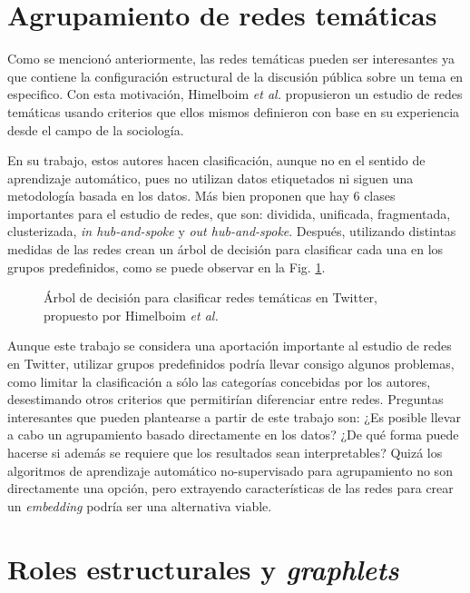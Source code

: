 \section{Agrupamiento de redes temáticas}

Como se mencionó anteriormente, las redes temáticas pueden ser interesantes ya que contiene la configuración estructural de la discusión pública sobre un tema en especifico. Con esta motivación, Himelboim \textit{ et al.} propusieron un estudio de redes temáticas usando criterios que ellos mismos definieron con base en su experiencia desde el campo de la sociología. 

En su trabajo, estos autores hacen clasificación, aunque no en el sentido de aprendizaje automático, pues no utilizan datos etiquetados ni siguen una metodología basada en los datos. Más bien proponen que hay 6 clases importantes para el estudio de redes, que son: dividida, unificada, fragmentada, clusterizada, \textit{in hub-and-spoke} y \textit{out hub-and-spoke}. Después, utilizando distintas medidas de las redes crean un árbol de decisión para clasificar cada una en los grupos predefinidos, como se puede observar en la Fig. \ref{fig:himelboim}.

 \begin{figure}[htbp]
   \centering
   
    \caption{Árbol de decisión para clasificar redes temáticas en Twitter, propuesto por Himelboim \textit{ et al.} \cite{himelboim_classifying_2017}} %
    \label{fig:himelboim}
\end{figure}

Aunque este trabajo se considera una aportación importante al estudio de redes en Twitter, utilizar grupos predefinidos podría llevar consigo algunos problemas, como limitar la clasificación a sólo las categorías concebidas por los autores, desestimando otros criterios que permitirían diferenciar entre redes. Preguntas interesantes que pueden plantearse a partir de este trabajo son: ¿Es posible llevar a cabo un agrupamiento basado directamente en los datos? ¿De qué forma puede hacerse si además se requiere que los resultados sean interpretables? Quizá los algoritmos de aprendizaje automático no-supervisado para agrupamiento no son directamente una opción, pero extrayendo características de las redes para crear un \textit{embedding} podría ser una alternativa viable.

\section{Roles estructurales y \textit{graphlets}} 


